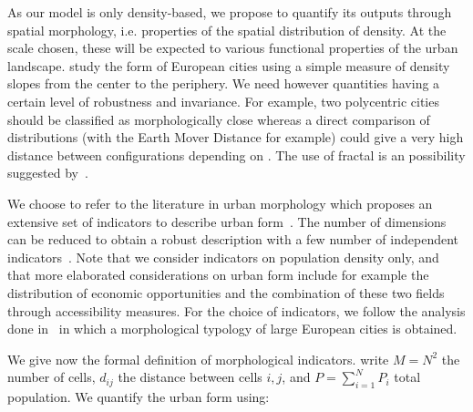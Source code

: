 \documentclass[10pt,letterpaper]{article}
\begin{document}
As our model is only density-based, we propose to quantify its outputs through spatial morphology, i.e. properties of the spatial distribution of density. At the scale chosen, these will be expected to  various functional properties of the urban landscape. \cite{guerois2008built} study the form of European cities using a simple measure of density slopes from the center to the periphery. We need however quantities having a certain level of robustness and invariance. For example, two polycentric cities should be classified as morphologically close whereas a direct comparison of distributions (with the Earth Mover Distance for example) could give a very high distance between configurations depending on . The use of fractal  is an  possibility  suggested by~\cite{2016arXiv160808839C}. 

We choose to refer to the literature in urban morphology which proposes an extensive set of indicators to describe urban form~\cite{tsai2005quantifying}. The number of dimensions can be reduced  to obtain a robust description with a few number of independent indicators~\cite{Schwarz201029}. Note that we consider  indicators on population density only, and that more elaborated considerations on urban form include for example the distribution of economic opportunities and the combination of these two fields through accessibility measures. For the choice of indicators, we follow the analysis done in~\cite{le2015forme} in which a morphological typology of large European cities is obtained.

We give now the formal definition of morphological indicators.  write $M=N^2$ the number of cells, $d_{ij}$ the distance between cells $i,j$, and $P=\sum_{i=1}^{N} P_i$ total population. We quantify the urban form using:
\end{document}
